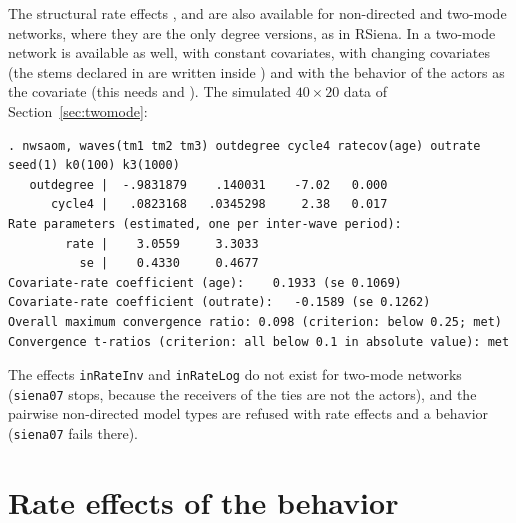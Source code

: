 The structural rate effects ,  and  are also available for non-directed and two-mode networks, where they are the only degree versions, as in RSiena. In a two-mode network  is available as well, with constant covariates, with changing covariates (the stems declared in  are written inside ) and with the behavior of the actors as the covariate (this needs  and ). The simulated $40\times20$ data of Section~\ref{sec:twomode}:
\begin{lstlisting}
. nwsaom, waves(tm1 tm2 tm3) outdegree cycle4 ratecov(age) outrate seed(1) k0(100) k3(1000)
   outdegree |  -.9831879    .140031    -7.02   0.000
      cycle4 |   .0823168   .0345298     2.38   0.017
Rate parameters (estimated, one per inter-wave period):
        rate |    3.0559     3.3033
          se |    0.4330     0.4677
Covariate-rate coefficient (age):    0.1933 (se 0.1069)
Covariate-rate coefficient (outrate):   -0.1589 (se 0.1262)
Overall maximum convergence ratio: 0.098 (criterion: below 0.25; met)
Convergence t-ratios (criterion: all below 0.1 in absolute value): met
\end{lstlisting}
The effects \texttt{inRateInv} and \texttt{inRateLog} do not exist for two-mode networks (\texttt{siena07} stops, because the receivers of the ties are not the actors), and the pairwise non-directed model types are refused with rate effects and a behavior (\texttt{siena07} fails there).

\section{Rate effects of the behavior}\label{sec:behrate}

